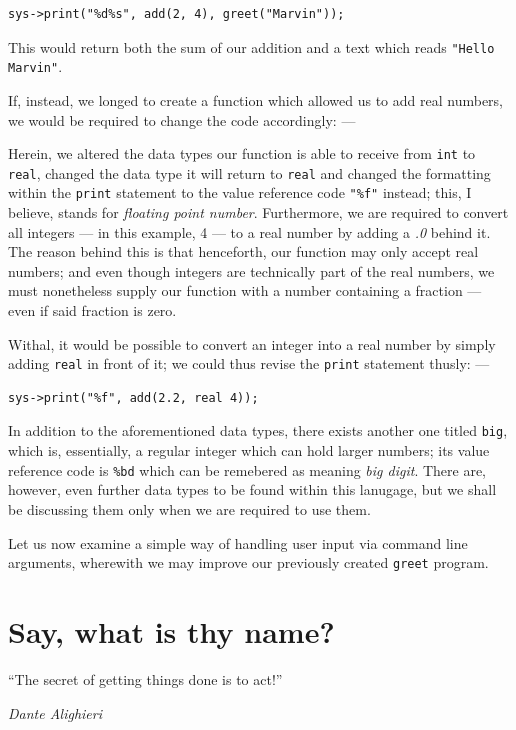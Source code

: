 \documentclass[a5paper,twoside,12pt]{report}
\begin{document}
\begin{lstlisting}
sys->print("%d%s", add(2, 4), greet("Marvin"));
\end{lstlisting}

This would return both the sum of our addition and a text which reads \texttt{"Hello Marvin"}.

If, instead, we longed to create a function which allowed us to add real numbers, we would be required to change the code accordingly: —



Herein, we altered the data types our function is able to receive from \texttt{int} to \texttt{real}, changed the data type it will return to \texttt{real} and changed the formatting within the \texttt{print} statement to the value reference code \texttt{"\%f"} instead; this, I believe, stands for \textit{floating point number}. Furthermore, we are required to convert all integers — in this example, 4 — to a real number by adding a \textit{.0} behind it. The reason behind this is that henceforth, our function may only accept real numbers; and even though integers are technically part of the real numbers, we must nonetheless supply our function with a number containing a fraction — even if said fraction is zero.

Withal, it would be possible to convert an integer into a real number by simply adding \texttt{real} in front of it; we could thus revise the \texttt{print} statement thusly: —

\begin{lstlisting}
sys->print("%f", add(2.2, real 4));
\end{lstlisting}

In addition to the aforementioned data types, there exists another one titled \texttt{big}, which is, essentially, a regular integer which can hold larger numbers; its value reference code is \texttt{\%bd} which can be remebered as meaning \textit{big digit}. There are, however, even further data types to be found within this lanugage, but we shall be discussing them only when we are required to use them.

Let us now examine a simple way of handling user input via command line arguments, wherewith we may improve our previously created \texttt{greet} program.

\chapter*{Say, what is thy name?}
\epigraph{``The secret of getting things done is to act!''}{\textit{Dante Alighieri}}
\end{document}
